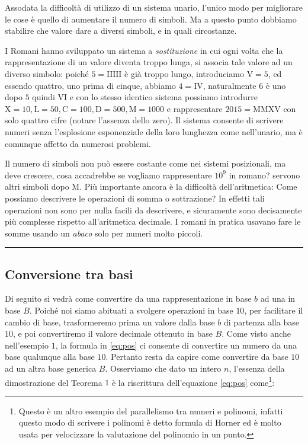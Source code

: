 Assodata la difficoltà di utilizzo di un sistema unario, l'unico modo per
migliorare le cose è quello di aumentare il numero di simboli. Ma a questo
punto dobbiamo stabilire che valore dare a diversi simboli, e in quali
circostanze.

I Romani hanno sviluppato un sistema a
\emph{sostituzione} in cui ogni volta che la rappresentazione di un valore
diventa troppo lunga, si associa tale valore ad un diverso simbolo: poiché $5 =
\mathrm{IIIII}$ è già troppo lungo, introduciamo $\mathrm{V} = 5$, ed essendo
quattro, uno prima di cinque, abbiamo $4 = \mathrm{IV}$, naturalmente $6$ è uno
dopo $5$ quindi $\mathrm{VI}$ e con lo stesso identico sistema possiamo
introdurre $\mathrm{X} = 10, \mathrm{L} = 50, \mathrm{C} = 100, \mathrm{D} =
500, \mathrm{M} = 1000$ e rappresentare $2015 = \mathrm{MMXV}$ con solo quattro
cifre (notare l'assenza dello zero). Il sistema consente di scrivere numeri
senza l'esplosione esponenziale della loro lunghezza come nell'unario, ma è
comunque affetto da numerosi problemi.

Il numero di simboli non può essere costante come nei sistemi posizionali, ma
deve crescere, cosa accadrebbe se vogliamo rappresentare $10^9$ in romano?
servono altri simboli dopo $\mathrm{M}$. Più importante ancora è la difficoltà
dell'aritmetica: Come possiamo descrivere le operazioni di somma o sottrazione?
In effetti tali operazioni non sono per nulla facili da descrivere, e
sicuramente sono decisamente più complesse rispetto all'aritmetica decimale. I
romani in pratica usavano fare le somme usando un \emph{abaco} solo per numeri
molto piccoli.\par
{\hfill \rule{0.9\textwidth}{0.5pt} \hfill}

\subsection{Conversione tra basi}

Di seguito si vedrà come convertire da una rappresentazione in base $b$ ad una
in base $B$. Poiché noi siamo abituati a svolgere operazioni in base $10$, per
facilitare il cambio di base, trasformeremo prima un valore dalla base $b$ di
partenza alla base $10$, e poi convertiremo il valore decimale ottenuto in base
$B$. Come visto anche nell'esempio $1$, la formula in \eqref{eq:pos} ci
consente di convertire un numero da una base qualunque alla base $10$. Pertanto
resta da capire come convertire da base $10$ ad un altra base generica $B$.
Osserviamo che dato un intero $n$, l'essenza della dimostrazione del Teorema $1$ è la riscrittura dell'equazione \eqref{eq:pos}
come\footnote{Questo è un altro esempio del parallelismo tra numeri e polinomi, infatti questo modo di scrivere i polinomi è detto formula di Horner ed è molto usata per velocizzare la valutazione del polinomio in un punto.}:

